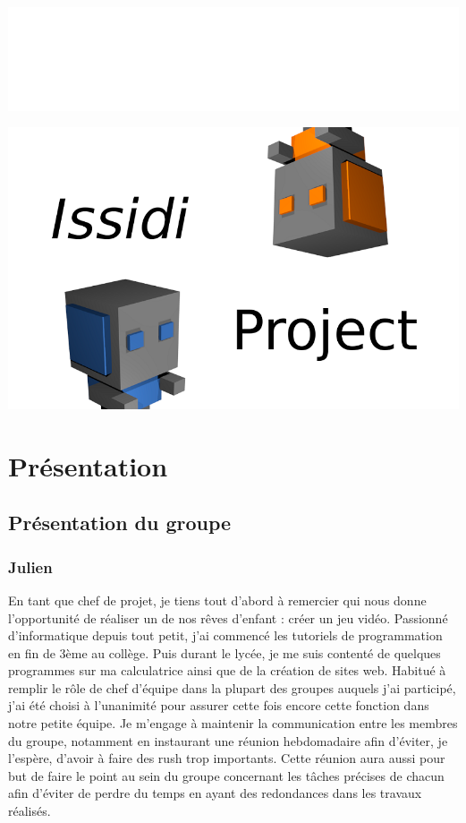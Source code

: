 ﻿\documentclass{article}
\begin{document}
\centerline{\includegraphics[scale=0.2]{latex_sa_pue.png}}
\centerline{\includegraphics[scale=0.5]{styler.png}}

\newpage\section{Présentation}

\subsection{Présentation du groupe}
\subsubsection{Julien }
En tant que chef de projet, je tiens tout d'abord à remercier  qui nous donne l'opportunité de réaliser 
un de nos rêves d'enfant : créer un jeu vidéo. Passionné d'informatique depuis tout petit, j'ai commencé les tutoriels 
de programmation en fin de 3ème au collège. Puis durant le lycée, je me suis contenté de quelques programmes sur 
ma calculatrice ainsi que de la création de sites web. Habitué à remplir le rôle de chef d'équipe dans la plupart des groupes auquels j'ai participé, j'ai été choisi à l'unanimité pour assurer cette fois encore cette fonction dans notre petite équipe. Je m'engage à maintenir la communication entre les membres du groupe, notamment en instaurant une réunion hebdomadaire afin d'éviter, je l'espère, d'avoir à faire des rush trop importants.
Cette réunion aura aussi
pour but de faire le point au sein du groupe concernant les tâches précises de chacun afin d'éviter de perdre du temps en ayant des 
redondances dans les travaux réalisés. \\
\end{document}
